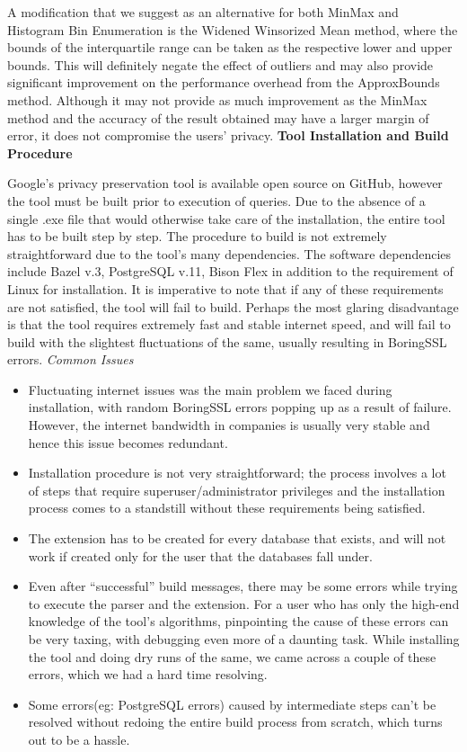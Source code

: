 \documentclass[acmsmall]{acmart}
\begin{document}
A modification that we suggest as an alternative for both MinMax and Histogram Bin Enumeration is the Widened Winsorized Mean method, where the bounds of the interquartile range can be taken as the respective lower and upper bounds. This will definitely negate the effect of outliers and may also provide significant improvement on the performance overhead from the ApproxBounds method. Although it may not provide as much improvement as the MinMax method and the accuracy of the result obtained may have a larger margin of error, it does not compromise the users’ privacy.
\newline
\newline
\newline
\textbf{Tool Installation and Build Procedure}

Google’s privacy preservation tool is available open source on GitHub, however the tool must be built prior to execution of queries. Due to the absence of a single .exe file that would otherwise take care of the installation, the entire tool has to be built step by step. The procedure to build is not extremely straightforward due to the tool’s many dependencies. The software dependencies include Bazel v.3, PostgreSQL v.11, Bison Flex in addition to the requirement of Linux for installation. It is imperative to note that if any of these requirements are not satisfied, the tool will fail to build. Perhaps the most glaring disadvantage is that the tool requires extremely fast and stable internet speed, and will fail to build with the slightest fluctuations of the same, usually resulting in BoringSSL errors.
\newline
\newline
\textit{Common Issues}
\begin{itemize}
    \item Fluctuating internet issues was the main problem we faced during installation, with random BoringSSL errors popping up as a result of failure. However, the internet bandwidth in companies is usually very stable and hence this issue becomes redundant.
    \item Installation procedure is not very straightforward; the process involves a lot of steps that require superuser/administrator privileges and the installation process comes to a standstill without these requirements being satisfied.
    \item The extension has to be created for every database that exists, and will not work if created only for the user that the databases fall under.
    \item Even after “successful” build messages, there may be some errors while trying to execute the parser and the extension. For a user who has only the high-end knowledge of the tool’s algorithms, pinpointing the cause of these errors can be very taxing, with debugging even more of a daunting task. While installing the tool and doing dry runs of the same, we came across a couple of these errors, which we had a hard time resolving.
    \item Some errors(eg: PostgreSQL errors)  caused by intermediate steps can’t be resolved without redoing the entire build process from scratch, which turns out to be a hassle.
\end{itemize}
\end{document}
